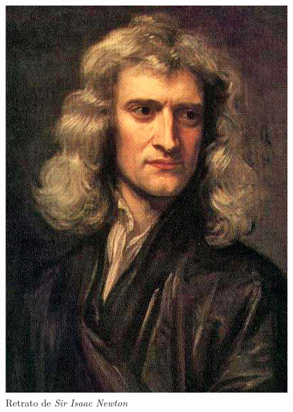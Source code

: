 \documentclass[14pt]{article}
\begin{document}
\begin{figure}[h]
\includegraphics[scale=0.2,angle=100]{isaac.png}
\caption{Retrato de \textit{Sir Isaac Newton}}
\label{fig:isaac}
\end{figure}
 
\end{document}
